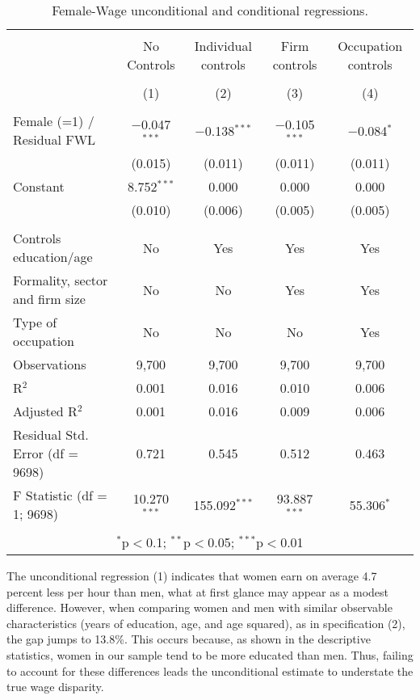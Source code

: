 \documentclass[12pt,a4paper,onecolumn]{article}
\begin{document}
\begin{table}[!htbp] \scriptsize\centering 
  \caption{Female-Wage unconditional and conditional regressions.} 
  \label{tab:gendergap} 
\begin{tabular}{@{\extracolsep{5pt}}lcccc} 
\\[-1.8ex]\hline 
\hline \\[-1.8ex] & No Controls & Individual controls & Firm controls & Occupation controls \\ 
\\[-1.8ex] & (1) & (2) & (3) & (4) \\ 
\hline \\[-1.8ex] 
Female (=1) / Residual FWL & $-$0.047$^{***}$ & $-$0.138$^{***}$ & $-$0.105$^{***}$ & $-$0.084$^{*}$ \\ 
 & (0.015) & (0.011) & (0.011) & (0.011) \\ 
Constant & 8.752$^{***}$ & 0.000 & 0.000 & 0.000 \\ 
 & (0.010) & (0.006) & (0.005) & (0.005) \\ 
\hline \\[-1.8ex] 
Controls education/age & No & Yes & Yes & Yes \\ 
Formality, sector and firm size & No & No & Yes & Yes \\ 
Type of occupation & No & No & No & Yes \\ 
Observations & 9,700 & 9,700 & 9,700 & 9,700 \\ 
R$^{2}$ & 0.001 & 0.016 & 0.010 & 0.006 \\ 
Adjusted R$^{2}$ & 0.001 & 0.016 & 0.009 & 0.006 \\ 
Residual Std. Error (df = 9698) & 0.721 & 0.545 & 0.512 & 0.463 \\ 
F Statistic (df = 1; 9698) & 10.270$^{***}$ & 155.092$^{***}$ & 93.887$^{***}$ & 55.306$^{*}$ \\ 
\hline 
\hline \\[-1.8ex] 
\multicolumn{5}{c}{\scriptsize $^{*}$p$<$0.1;\; $^{**}$p$<$0.05;\; $^{***}$p$<$0.01} \\ 
\end{tabular} 
\end{table}

The unconditional regression (1) indicates that women earn on average 4.7 percent less per hour than men, what at first glance may appear as a modest difference. However, when comparing women and men with similar observable characteristics (years of education, age, and age squared), as in specification (2), the gap jumps to 13.8\%. This occurs because, as shown in the descriptive statistics, women in our sample tend to be more educated than men. Thus, failing to account for these differences leads the unconditional estimate to understate the true wage disparity. 
\end{document}
